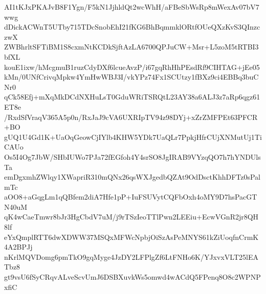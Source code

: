 AI1tKJxPKAJvB8F1Ygn/F5kN1JjhldQt2wcWhH/aFBeSbWsRp8mWexAv07bV7wwg
dDickACWnT5UTby715TDcSnobEhI21fKG6BhBqmmklORtfOUeQXzKvS3QInzczwX
ZWBhrltSFTiBM1S8cxmNtKCDkSjftAzLA6700QPJuCW+Msr+L5zoM5tRTBI3bfXL
kouE1ixw/hMcgmuB1ruzCdyDXf6lcueAvzP/i67gqRhHhPEsdRf9CIHTAG+jEe05
kMn/0UNfCrivqMpkw4YmHwWBJ3I/vkYPz74Fx1SCUtzy1fBXz9ci4EBBq3buCNr0
qCk58Efj+mXqMkDCdNXHuLsT0GduWRiTSRQtL23AY38a6ALJ3z7aRp6qgz61ET8e
/RxdSfVraqV365A5p0n/RxJaJ9cVA6UXRIpTV94z98DYj+xZrZMFPEt63PFCR+BO
gUQ1U4Gd1K+UaOqGeowCjIYlb4KHW5YDk7UaQLr7PpkjHfrCUjXNMutUj1TiCAUo
Os5I4Og7JbW/SHbIUWo7PJa72fEGfoh4Y4srSO8JgIRAB9VYzqQO7h7hYNDUlsTa
emDgxmhZWlqy1XWapriR310mQNx26qsWXJgedbQZAt9OdDsctKhhDFTz0sPalmTc
aOO8+aGqgLm1qQBfem2diA7Hfe1pP+IuFSUVytCQFbOxh4oMY9D7hsPacGTN40uM
qK4wCaeTmwr8bJr3HgCbdV7uM/j9rTSzIeoTTlPwn2LEEiu+EcwVGnR2jr8QH8lf
eYxQmplRTT6dwXDWW37MSQxMFWcNpbjOiSzAsPeMNYS61kZiUoqfnCrmK4A2BPJj
nKrlMQVDomg6pmTkO9gqMyge4JzDY2LFPlgZf6LtFNHo6K/YJxvxVLT25lEATbz8
gt9vsU6fSyCRqvALveScvUmJ6DSBXuvkWs5omwd4wACdQ5FPenq8O8c2WPNPxfiC
